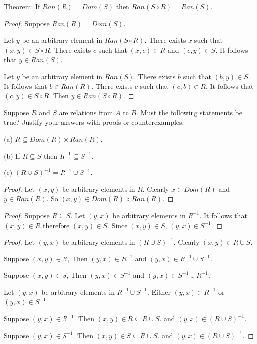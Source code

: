 Theorem: If $Ran(R) = Dom(S)$ then $Ran(S \circ R) = Ran(S)$.

\begin{proof}
    Suppose $Ran(R) = Dom(S)$.

    Let $y$ be an arbitrary element in $Ran(S \circ R)$.
    There exists $x$ such that $(x, y) \in S \circ R$.
    There exists $c$ such that $(x, c) \in R$ and $(c, y) \in S$.
    It follows that $y \in Ran(S)$.

    Let $y$ be an arbitrary element in $Ran(S)$. 
    There exists $b$ such that $(b, y) \in S$.
    It follows that $b \in Ran(R)$. 
    There exists $c$ such that $(c, b) \in R$.
    It follows that $(c, y) \in S \circ R$.
    Then $y \in Ran(S \circ R)$.
\end{proof}

\begin{tcolorbox}[title=Problem 10, breakable]
    Suppose $R$ and $S$ are relations from $A$ to $B$. Must the following statements be true?
    Justify your answers with proofs or counterexamples.

    (a) $R \subseteq Dom(R) \times Ran(R)$.

    (b) If $R \subseteq S$ then $R^{-1} \subseteq S^{-1}$.

    (c) ${(R \cup S)}^{-1} = R^{-1} \cup S^{-1}$.
\end{tcolorbox}

\begin{proof}
    Let $(x, y)$ be arbitrary elements in $R$.
    Clearly $x \in Dom(R)$ and $y \in Ran(R)$.
    So $(x, y) \in Dom(R) \times Ran(R)$.
\end{proof}

\begin{proof}
    Suppose $R \subseteq S$.
    Let $(y, x)$ be arbitrary elements in $R^{-1}$.
    It follows that $(x, y) \in R$ therefore $(x, y) \in S$.
    Since $(x, y) \in S$, $(y, x) \in S^{-1}$.
\end{proof}

\begin{proof}
    Let $(y, x)$ be arbitrary elements in ${(R \cup S)}^{-1}$.
    Clearly $(x, y) \in R \cup S$.

    Suppose $(x, y) \in R$, Then $(y, x) \in R^{-1}$ and $(y, x) \in R^{-1} \cup S^{-1}$.

    Suppose $(x, y) \in S$, Then $(y, x) \in S^{-1}$ and $(y, x) \in S^{-1} \cup R^{-1}$.

    Let $(y, x)$ be arbitrary elements in $R^{-1} \cup S^{-1}$.  
    Either $(y, x) \in R^{-1}$ or $(y, x) \in S^{-1}$.  

    Suppose $(y, x) \in R^{-1}$. Then $(x, y) \in R \subseteq R \cup S$.  
    and $(y, x) \in {(R \cup S)}^{-1}$.  

    Suppose $(y, x) \in S^{-1}$. Then $(x, y) \in S \subseteq R \cup S$.  
    and $(y, x) \in {(R \cup S)}^{-1}$.  
\end{proof}

